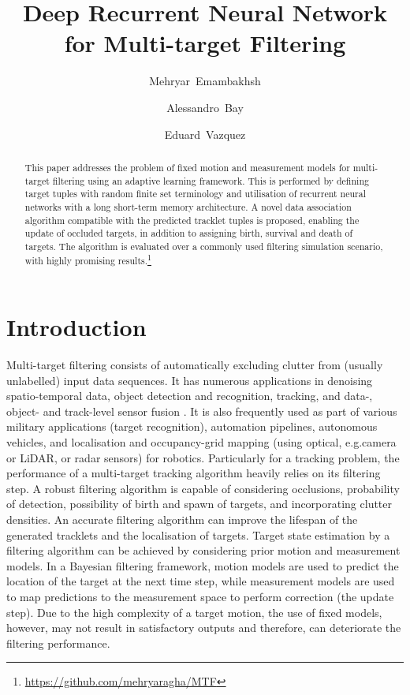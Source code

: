 \documentclass[runningheads]{llncs}
\begin{document}
\title{Deep Recurrent Neural Network\\for Multi-target Filtering}
\author{Mehryar~Emambakhsh\and
Alessandro~Bay\and
Eduard~Vazquez}
\maketitle              %
\begin{abstract}
This paper addresses the problem of fixed motion and measurement models for multi-target filtering using an adaptive learning framework. This is performed by defining target tuples with random finite set terminology and utilisation of recurrent neural networks with a long short-term memory architecture. A novel data association algorithm compatible with the predicted tracklet tuples is proposed, enabling the update of occluded targets, in addition to assigning birth, survival and death of targets. The algorithm is evaluated over a commonly used filtering simulation scenario, with highly promising results.\footnote{\url{https://github.com/mehryaragha/MTF}}

\end{abstract}

\section{Introduction}
Multi-target filtering consists of automatically excluding clutter from (usually unlabelled) input data sequences. It has numerous applications in denoising spatio-temporal data, object detection and recognition, tracking, and data-, object- and track-level sensor fusion \cite{Vo:2005,Vo:2014,Fantacci:2018}. It is also frequently used as part of various military applications (target recognition), automation pipelines, autonomous vehicles, and localisation and occupancy-grid mapping (using optical, e.g.\stereo camera or LiDAR, or radar sensors) for robotics.
Particularly for a tracking problem, the performance of a multi-target tracking algorithm heavily relies on its filtering step. A robust filtering algorithm
is capable of considering occlusions, probability of detection, possibility of birth and spawn of targets, and incorporating clutter densities. 
An accurate filtering algorithm can improve the lifespan of the generated tracklets and the localisation of targets.
Target state estimation by a filtering algorithm can be achieved by considering prior motion and measurement models. In a Bayesian filtering framework, motion models are used to predict the location of the target at the next time step, while measurement models are used to map predictions to the measurement space to perform correction (the update step).
Due to the high complexity of a target motion, the use of fixed models, however, may not result in satisfactory outputs and therefore, can deteriorate the filtering performance.
\end{document}
